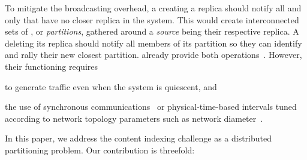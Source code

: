 To mitigate the broadcasting overhead, a \process creating a replica
should notify all and only \processes that have no closer replica in
the system. This would create interconnected sets of \processes, or
\emph{partitions}, gathered around a \emph{source} being their
respective replica. A \process deleting its replica should notify all
members of its partition so they can identify and rally their new
closest partition.  already
provide both
operations~\cite{hemmati2015namebased,sohier2012physarum}. However,
their functioning requires
\begin{inparaenum}[(i)]
\item to generate traffic even when the system is quiescent, and
\item the use of synchronous communications~\cite{sohier2012physarum}
  or physical-time-based intervals tuned according to network topology
  parameters such as network diameter~\cite{hemmati2015namebased}.
\end{inparaenum}


\noindent In this paper, we address the content indexing challenge as
a distributed partitioning problem. Our contribution is threefold:

